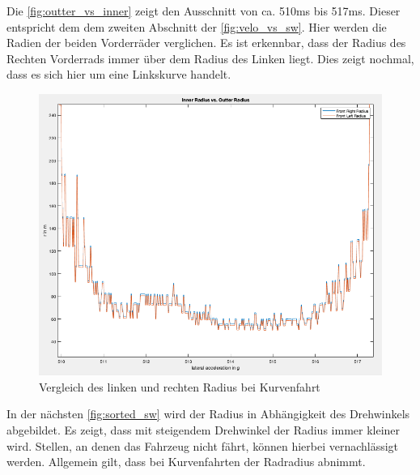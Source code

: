 \newpage
	Die \autoref{fig:outter_vs_inner} zeigt den Ausschnitt von ca. 510ms bis 517ms. Dieser entspricht dem dem zweiten Abschnitt der \autoref{fig:velo_vs_sw}. Hier werden die Radien der beiden Vorderräder verglichen. Es ist erkennbar, dass der Radius des Rechten Vorderrads immer über dem Radius des Linken liegt. Dies zeigt nochmal, dass es sich hier um eine Linkskurve handelt.
	\begin{figure}[h!]
		\centering
		\includegraphics[width=1\linewidth]{../Graphiken/outter_vs_inner}
		\caption{Vergleich des linken und rechten Radius bei Kurvenfahrt}
		\label{fig:outter_vs_inner}
	\end{figure}
\cleardoublepage
\newpage


	In der nächsten \autoref{fig:sorted_sw} wird der Radius in Abhängigkeit des Drehwinkels abgebildet. Es zeigt, dass mit steigendem Drehwinkel der Radius immer kleiner wird. Stellen, an denen das Fahrzeug nicht fährt, können hierbei vernachlässigt werden. Allgemein gilt, dass bei Kurvenfahrten der Radradius abnimmt.
	
